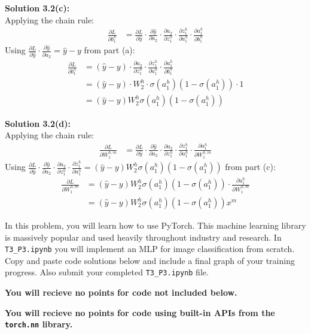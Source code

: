 \documentclass[submit]{harvardml}
\begin{document}
\noindent\textbf{Solution 3.2(c):}\\
Applying the chain rule:
\begin{align*}
    \frac{\partial L}{\partial b_1^h} &= \frac{\partial L}{\partial \hat{y}} \cdot \frac{\partial \hat{y}}{\partial a_2} \cdot \frac{\partial a_2}{\partial z_1^h} \cdot \frac{\partial z_1^h}{\partial a_1^h}
    \cdot \frac{\partial a_1^h}{\partial b_1^h}
\end{align*}
Using $\frac{\partial L}{\partial \hat{y}} \cdot \frac{\partial \hat{y}}{\partial a_2} = \hat{y} - y$ from part (a):
\begin{align*}
    \frac{\partial L}{\partial b_1^h} &= (\hat{y}-y) \cdot \frac{\partial a_2}{\partial z_1^h} \cdot \frac{\partial z_1^h}{\partial a_1^h}
    \cdot \frac{\partial a_1^h}{\partial b_1^h}\\
    &= (\hat{y}-y) \cdot W_2^h \cdot \sigma(a_1^h)(1-\sigma(a_1^h)) \cdot 1\\
    &= (\hat{y}-y) W_2^h \sigma(a_1^h)(1-\sigma(a_1^h))
\end{align*}

\noindent\textbf{Solution 3.2(d):}\\
Applying the chain rule:
\begin{align*}
    \frac{\partial L}{\partial W_1^{h,m}} &= \frac{\partial L}{\partial \hat{y}} \cdot \frac{\partial \hat{y}}{\partial a_2} \cdot \frac{\partial a_2}{\partial z_1^h} \cdot \frac{\partial z_1^h}{\partial a_1^h}
    \cdot \frac{\partial a_1^h}{\partial W_1^{h,m}}
\end{align*}
Using $\frac{\partial L}{\partial \hat{y}} \cdot \frac{\partial \hat{y}}{\partial a_2} \cdot \frac{\partial a_2}{\partial z_1^h} \cdot \frac{\partial z_1^h}{\partial a_1^h} = (\hat{y}-y) W_2^h \sigma(a_1^h)(1-\sigma(a_1^h)) $ from part (c):
\begin{align*}
    \frac{\partial L}{\partial W_1^{h,m}} &= (\hat{y}-y) W_2^h \sigma(a_1^h)(1-\sigma(a_1^h))
    \cdot \frac{\partial a_1^h}{\partial W_1^{h,m}}\\
    &= (\hat{y}-y) W_2^h \sigma(a_1^h)(1-\sigma(a_1^h)) x^m
\end{align*}


\newpage

\begin{problem}
  In this problem, you will learn how to use PyTorch. This machine learning library is massively popular and used heavily throughout industry and research. In \verb|T3_P3.ipynb| you will implement an MLP for image classification from scratch. Copy and paste code solutions below and include a final graph of your training progress. Also submit your completed \verb|T3_P3.ipynb| file.

  {\bfseries You will recieve no points for code not included below.}

  {\bfseries You will recieve no points for code using built-in APIs from the \verb|torch.nn| library.}
  
\end{problem}
\end{document}
